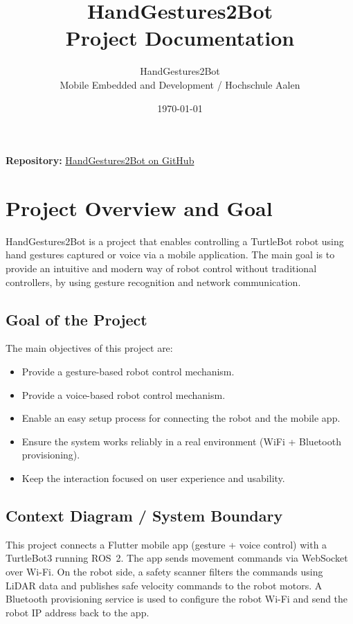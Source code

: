 \documentclass[11pt,a4paper]{article}
\title{\textbf{HandGestures2Bot} \\ Project Documentation}
\author{HandGestures2Bot \\ Mobile Embedded and Development / Hochschule Aalen}
\date{\today}
\begin{document}
\maketitle
\thispagestyle{empty}
\vspace{1cm}

\begin{center}
\textbf{Repository:} \href{https://github.com/notWetro/HandGestures2Bot.git}{HandGestures2Bot on GitHub}
\end{center}

\newpage
\tableofcontents
\newpage

\section{Project Overview and Goal}
HandGestures2Bot is a project that enables controlling a TurtleBot robot using hand gestures captured or voice  via a mobile application.
The main goal is to provide an intuitive and modern way of robot control without traditional controllers, by using gesture recognition and network communication.

\subsection{Goal of the Project}
The main objectives of this project are:
\begin{itemize}[leftmargin=1.5cm]
    \item Provide a gesture-based robot control mechanism.
    \item Provide a voice-based robot control mechanism.
    \item Enable an easy setup process for connecting the robot and the mobile app.
    \item Ensure the system works reliably in a real environment (WiFi + Bluetooth provisioning).
    \item Keep the interaction focused on user experience and usability.
\end{itemize}

\subsection{Context Diagram / System Boundary}
This project connects a Flutter mobile app (gesture + voice control) with a TurtleBot3 running ROS~2.
The app sends movement commands via WebSocket over Wi-Fi. On the robot side, a safety scanner filters
the commands using LiDAR data and publishes safe velocity commands to the robot motors.
A Bluetooth provisioning service is used to configure the robot Wi-Fi and send the robot IP address back to the app.
\end{document}
